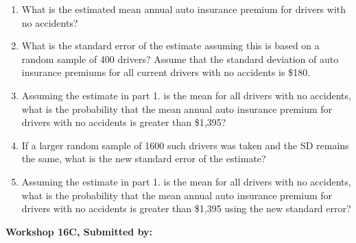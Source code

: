 \documentclass[11pt]{book}\usepackage[]{graphicx}\usepackage[]{color}
\begin{document}
\begin{exercises}
\begin{exercise}
\begin{enumerate}
\item  What is the estimated mean annual auto insurance premium for drivers with no accidents?
\item  What is the standard error of the estimate assuming this is based on a random sample of 400 drivers? Assume that the standard deviation of auto insurance premiums for all current drivers with no accidents is \$180.
\item  Assuming the estimate in part 1. is the mean for all drivers with no accidents, what is the probability that the mean annual auto insurance premium for drivers with no accidents is greater than \$1,395?
\item  If a larger random sample of 1600 such drivers was taken and the SD remains the same, what is the new standard error of the estimate?
\item  Assuming the estimate in part 1. is the mean for all drivers with no accidents, what is the probability that the mean annual auto insurance premium for drivers with no accidents is greater than \$1,395 using the new standard error?
\end{enumerate}

\end{exercise}
\begin{solution}  %

\end{solution}

\clearpage

    \begin{exercise}  %

    \begin{center}
\begin{flushleft}\textbf{\large \hfill Workshop 16C, Submitted by: }\end{flushleft}

\end{center}
\end{exercise}
\end{exercises}
\end{document}
